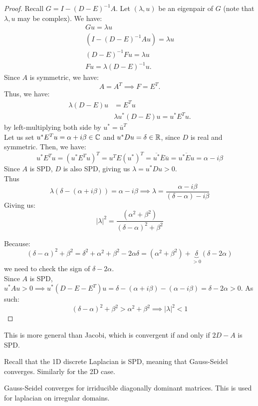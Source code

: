 \documentclass[../main/main.tex]{subfiles}
\begin{document}
\begin{proof}
  Recall $G=I-(D-E)^{-1} A$. Let $(\lambda,u)$ be an eigenpair of $G$ (note that $\lambda,u$ may be complex). We have:
  \begin{align*}
Gu =  \lambda u \\
    (I-(D-E)^{-1}A u) = \lambda u \\
    (D-E)^{-1} F u = \lambda u \\
    Fu = \lambda (D-E)^{-1} u
    .\end{align*}
  Since $A$ is symmetric, we have: \[
A=A^{T} \implies F = E^{T}
.\] Thus, we have:
\begin{align*}
  \lambda(D-E) u &= E^{T} u \\
&\lambda u^{*} (D-E)u= u^{*}E^{T} u
                                 .\end{align*}
                               by  left-multiplying both side by $u^{*}=\overline{u}^{T}$  \\

                               Let us set $u^{*} E^{T} u = \alpha +i \beta \in \mathbb{C}$ and $u^{*}D u = \delta \in \mathbb{R}$, since $D$ is real and symmetric. Then, we have:
                               \[
u^{*}E^{T} u = (u^{*}E^{T} u)^{T} = u^{T} E (u^{*})^{T} = \overline{u^{*}} \overline{E} \overline{u} = \overline{u^{*}E u} = \alpha - i \beta
\]
Since $A$ is SPD,  $D$ is also SPD, giving us $\lambda = u^{*}D u > 0$. \\

Thus  \[
\lambda(\delta - (\alpha+i\beta)) = \alpha-i\beta \implies \lambda = \frac{\alpha-i\beta}{(\delta-\alpha)-i\beta}
\]Giving us: \[
|\lambda|^2 = \frac{(\alpha^2+\beta^2)}{(\delta-\alpha)^2+\beta^2}
\]

Because: \[
(\delta-\alpha)^2+\beta^2 = \delta^2+\alpha^2+\beta^2 - 2\alpha\delta = (\alpha^2+\beta^2)+\underbrace{\delta}_{>0}(\delta-2\alpha)
\] we need to check the sign of $\delta-2\alpha$. \\

Since $A $ is SPD, $u^{*}Au>0 \implies u^{*}(D-E-E^{T})u = \delta -(\alpha+i\beta) - (\alpha - i\beta) = \delta -2\alpha > 0 $. As such: \[
(\delta - \alpha)^2 +\beta^2 > \alpha^2 +\beta^2 \implies |\lambda|^2 < 1
\]
\end{proof}

\begin{remark}
This is more general than Jacobi, which is convergent if and only if $2D-A$ is SPD.
\end{remark}
\begin{example}
  Recall that the 1D discrete Laplacian is SPD, meaning that Gauss-Seidel converges. Similarly for the 2D case.
\end{example}
\begin{example}
  Gauss-Seidel converges for irriducible diagonally dominant matrices. This is used for laplacian on irregular domains.
\end{example}
\end{document}
